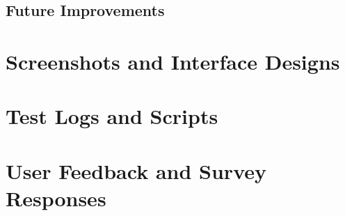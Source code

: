 \documentclass[12pt,a4paper]{report}
\begin{document}
\section{Future Improvements}

\appendix
\chapter{Screenshots and Interface Designs}
\chapter{Test Logs and Scripts}
\chapter{User Feedback and Survey Responses}

\end{document}
